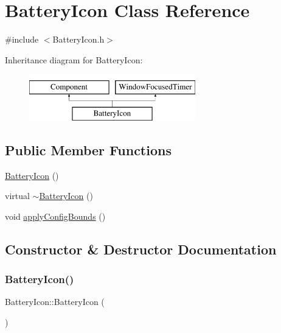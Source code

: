 \hypertarget{classBatteryIcon}{}\section{Battery\+Icon Class Reference}
\label{classBatteryIcon}


{\ttfamily \#include $<$Battery\+Icon.\+h$>$}

Inheritance diagram for Battery\+Icon\+:\begin{figure}[H]
\begin{center}
\leavevmode
\includegraphics[height=2.000000cm]{classBatteryIcon}
\end{center}
\end{figure}
\subsection*{Public Member Functions}
\begin{DoxyCompactItemize}
\item 
\mbox{\hyperlink{classBatteryIcon_a197bb50ceb740f8aa3a7f1082d7b5a77}{Battery\+Icon}} ()
\item 
virtual \mbox{\hyperlink{classBatteryIcon_a2482be26740b3ca820657f2b720c7ff3}{$\sim$\+Battery\+Icon}} ()
\item 
void \mbox{\hyperlink{classBatteryIcon_afce051caf07675373237acf81f1fa1e6}{apply\+Config\+Bounds}} ()
\end{DoxyCompactItemize}


\subsection{Constructor \& Destructor Documentation}
\mbox{\label{classBatteryIcon_a197bb50ceb740f8aa3a7f1082d7b5a77}} 
\subsubsection{\texorpdfstring{Battery\+Icon()}{BatteryIcon()}}
{\footnotesize\ttfamily Battery\+Icon\+::\+Battery\+Icon (\begin{DoxyParamCaption}{ }\end{DoxyParamCaption})}

